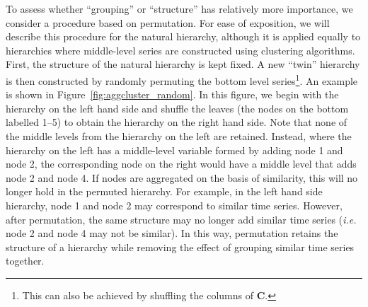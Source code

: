 \documentclass[a4paper,review,12pt,authoryear]{elsarticle}
\begin{document}
To assess whether ``grouping'' or ``structure'' has relatively more importance, we consider a procedure based on permutation. For ease of exposition, we will describe this procedure for the natural hierarchy, although it is applied equally to hierarchies where middle-level series are constructed using clustering algorithms. First, the structure of the natural hierarchy is kept fixed. A new ``twin'' hierarchy is then constructed by randomly permuting the bottom level series\footnote{This can also be achieved by shuffling the columns of $\boldsymbol{C}$.}. An example is shown in Figure~\ref{fig:aggcluster_random}. {\color{purple} In this figure, we begin with the hierarchy on the left hand side and shuffle the leaves (the nodes on the bottom labelled 1--5) to obtain the hierarchy on the right hand side. Note that none of the middle levels from the hierarchy on the left are retained. Instead, where the hierarchy on the left has a middle-level variable formed by adding node 1 and node 2, the corresponding node on the right would have a middle level that adds node 2 and node 4. %
If nodes are aggregated on the basis of similarity, this will no longer hold in the permuted hierarchy. For example, in the left hand side hierarchy, node 1 and node 2 may correspond to similar time series. However, after permutation, the same structure may no longer add similar time series (\textit{i.e.} node 2 and node 4 may not be similar). In this way, permutation retains the structure of a hierarchy while removing the effect of grouping similar time series together.}

\end{document}
